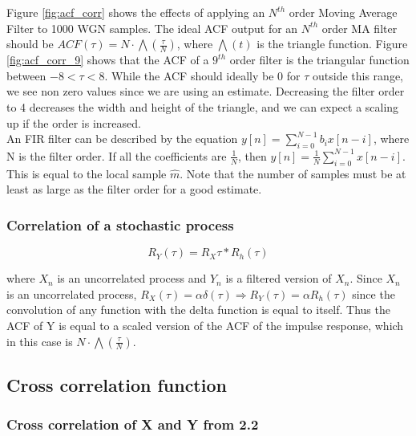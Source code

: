 Figure \ref{fig:acf_corr} shows the effects of applying an $N^{th}$ order Moving Average Filter to 1000 WGN samples. The ideal ACF output for an $N^{th}$ order MA filter should be $ACF(\tau) = N \cdot \bigwedge(\frac{\tau}{N})$, where $\bigwedge(t)$ is the triangle function. Figure \ref{fig:acf_corr_9} shows that the ACF of a $9^{th}$ order filter is the triangular function between $-8<\tau<8$. While the ACF should ideally be 0 for $\tau$ outside this range, we see non zero values since we are using an estimate. Decreasing the filter order to 4 decreases the width and height of the triangle, and we can expect a scaling up if the order is increased.\\

An FIR filter can be described by the equation $y[n]=\sum_{i=0}^{N-1}b_ix[n-i]$, where N is the filter order. If all the coefficients are $\frac{1}{N}$, then $y[n]=\frac{1}{N} \sum_{i=0}^{N-1}x[n-i]$. This is equal to the local sample $\hat{m}$. Note that the number of samples must be at least as large as the filter order for a good estimate.

\subsubsection{Correlation of a stochastic process}

\begin{equation}
R_Y(\tau)=R_X{\tau} \ast R_h(\tau)
\end{equation}

where $X_n$ is an uncorrelated process and $Y_n$ is a filtered version of $X_n$. Since $X_n$ is an uncorrelated process, $R_X(\tau)=\alpha \delta(\tau) \Rightarrow R_Y(\tau)=\alpha R_h(\tau)$ since the convolution of any function with the delta function is equal to itself. Thus the ACF of Y is equal to a scaled version of the ACF of the impulse response, which in this case is $N \cdot \bigwedge(\frac{\tau}{N})$.

\vspace{0.5cm}

\subsection{Cross correlation function}

\subsubsection{Cross correlation of X and Y from 2.2}

